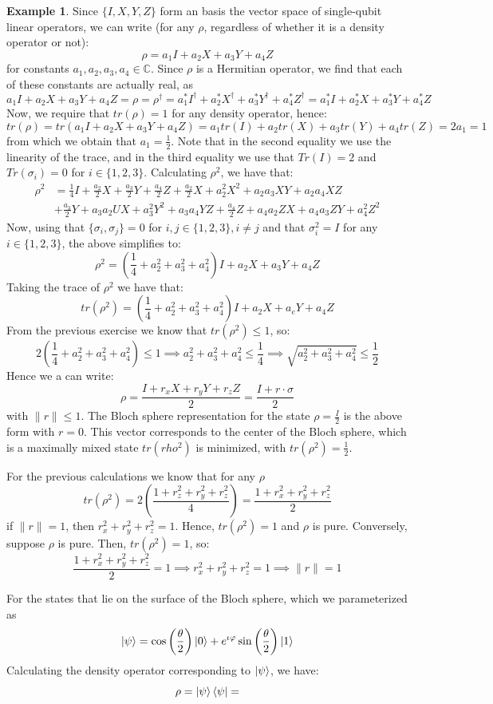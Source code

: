 \documentclass[12pt, oneside]{book}
\theoremstyle{definition}
\theoremstyle{definition}
\newtheorem{example}{Example}[section]
\theoremstyle{remark}
\begin{document}
\begin{example}
    Since $\{I,X,Y,Z\}$ form an basis the vector space of single-qubit linear operators, we can write (for any $\rho$, regardless of whether it is a density operator or not):
    \[
    \rho=a_1I+a_2X+a_3Y+a_4Z
    \]
    for constants $a_1,a_2,a_3,a_4 \in\mathbb{C}$. Since $\rho$ is a Hermitian operator, we find that each of these constants are actually real, as 
    \[
    a_1I+a_2X+a_3Y+a_4Z=\rho =\rho^{\dagger}=a_1^*I^{\dagger}+a_2^*X^{\dagger}+a_3^*Y^{\dagger}+a_4^*Z^{\dagger}=a_1^*I+a_2^*X+a_3^*Y+a_4^*Z
    \]
    Now, we require that $tr(\rho)=1$ for any density operator, hence:
    \[
    tr(\rho)=tr(a_1I+a_2X+a_3Y+a_4Z)=a_1tr(I)+a_2tr(X)+a_3tr(Y)+a_4tr(Z)=2a_1=1
    \]
    from which we obtain that $a_1=\frac{1}{2}$. Note that in the second equality we use the linearity of the trace, and in the third equality we use that $Tr(I)=2$ and $Tr(\sigma_i)=0$ for $i\in\{1,2,3\}$. Calculating $\rho^2$, we have that:
    \begin{align*}
    \rho^2&=\frac{1}{4}I+\frac{a_2}{2}X+\frac{a_3}{2}Y+\frac{a_4}{2}Z+\frac{a_2}{2}X+a_2^2X^2+a_2a_3XY+a_2a_4XZ\\
    &+\frac{a_3}{2}Y+a_3a_2UX+a_3^2Y^2+a_3a_4YZ+\frac{a_4}{2}Z+a_4a_2ZX+a_4a_3ZY+a_4^2Z^2
    \end{align*}
    Now, using that $\{\sigma_i,\sigma_j\}=0$ for $i,j \in \{1,2,3\},i\neq j$ and that $\sigma_i^2=I$ for any $i\in\{1,2,3\}$, the above simplifies to:
    \[
    \rho^2=\left(\frac{1}{4}+a_2^2+a_3^2+a_4^2\right)I+a_2X+a_3Y+a_4Z
    \]
    Taking the trace of $\rho^2$ we have that:
    \[
    tr(\rho^2)=\left(\frac{1}{4}+a_2^2+a_3^2+a_4^2\right)I+a_2X+a_eY+a_4Z
    \]
    From the previous exercise we know that $tr(\rho^2)\leq 1$, so:
    \[
    2\left(\frac{1}{4}+a_2^2+a_3^2+a_4^2\right) \leq 1 \implies a_2^2+a_3^2+a_4^2 \leq \frac{1}{4} \implies \sqrt{a_2^2+a_3^2+a_4^2}\leq \frac{1}{2}
    \]
    Hence we a can write:
    \[
    \rho=\frac{I+r_xX+r_yY+r_zZ}{2}=\frac{I+r \cdot \sigma}{2}
    \]
    with $\|r\|\leq 1$.
    The Bloch sphere representation for the state $\rho=\frac{I}{2}$ is the above form with $r=0$. This vector corresponds to the center of the Bloch sphere, which is a maximally mixed state $tr(rho^2)$ is minimized, with $tr(\rho^2)=\frac{1}{2}$.

    For the previous calculations we know that for any $\rho$
    \[
    tr(\rho^2)=2\left(\frac{1+r_z^2+r_y^2+r_z^2}{4}\right)=\frac{1+r_x^2+r_y^2+r_z^2}{2}
    \]
    if $\|r\|=1$, then $r_x^2 +r_y^2+r_z^2=1$. Hence, $tr(\rho^2)=1$ and $\rho$ is pure. Conversely, suppose $\rho$ is pure. Then, $tr(\rho^2)=1$, so:
    \[
    \frac{1+r_x^2+r_y^2+r_z^2}{2}=1 \implies r_x^2+r_y^2+r_z^2 = 1 \implies \|r\|=1
    \]

    For the states that lie on the surface of the Bloch sphere, which we parameterized as
    \[
    \ket{\psi}=\cos\left(\frac{\theta}{2}\right) \ket{0}+e^{\iota \varphi} \sin\left(\frac{\theta}{2}\right) \ket{1}
    \]
    Calculating the density operator corresponding to $\ket{\psi}$, we have:
    \[
    \rho=\ket{\psi}\bra{\psi} = 
    \]
\end{example}

\backmatter  %
    
    
\end{document}
